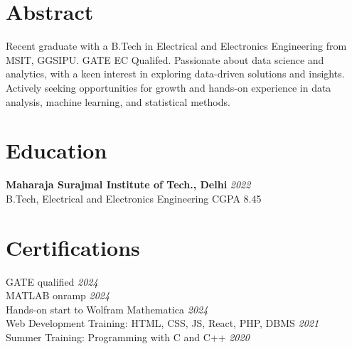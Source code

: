 \documentclass[12pt]{article}
\newcommand{\entry}[4]{{{\textbf{#1}}} \hfill \textit{#3} \\ {\footnotesize #2 \hfill #4} \\}
\newcommand{\display}[3]{\footnotesize #1 \hfill \href{#2}{\faCertificate}  \textit{#3} \\}
\begin{document}
\begin{paracol}{2}
\switchcolumn


\section{Abstract}
  \footnotesize {Recent graduate with a B.Tech in Electrical and Electronics Engineering from MSIT, GGSIPU. GATE EC Qualifed. Passionate about data science and analytics, with a keen interest in exploring data-driven solutions and insights. Actively seeking opportunities for growth and hands-on experience in data analysis, machine learning, and statistical methods.} 




\section{Education}

\entry{Maharaja Surajmal Institute of Tech., Delhi}{B.Tech, Electrical and Electronics Engineering}{2022}{CGPA 8.45}



\section{Certifications}
\display{GATE qualified}{https://drive.google.com/file/d/1shcvrExVXRHoQDvvzEtomb_LwSz4b1zZ/view?usp=sharing}{2024}
\display{MATLAB onramp}{https://drive.google.com/file/d/1mkDalK8A1keLxXXYWNhQnshTT9sq1vor/view?usp=sharing}{2024}
\display{Hands-on start to Wolfram Mathematica}{https://drive.google.com/file/d/1UMcH0YTn9qbdHo8LIr4tHWEiZi-Xrejt/view?usp=sharing}{2024}
\display{Web Development Training: HTML, CSS, JS, React, PHP, DBMS}{https://drive.google.com/file/d/1BNM1FAxmFkPRrkxTPHEAF5gk_rhXNg5g/view?usp=sharing}{2021}
\display{Summer Training: Programming with C and C++}{https://drive.google.com/file/d/190HRy9cnmwrG0kCt_TeKr5rngykm1PkW/view?usp=sharing}{2020}



\end{paracol}
\end{document}
